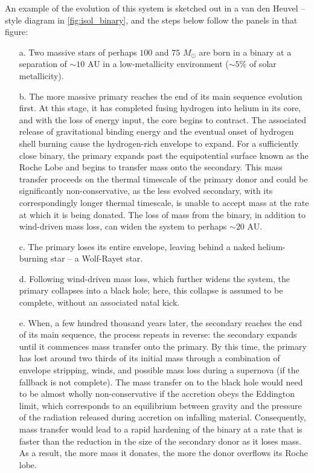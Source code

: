 \documentclass[review]{elsarticle}
\begin{document}
An example of the evolution of this system is sketched out in a van den Heuvel -- style diagram in \autoref{fig:isol_binary}, and the steps below follow the panels in that figure:
\begin{enumerate}  
\item[a.] Two massive stars of perhaps $100$ and $75$ $M_{\odot}$ are born in a binary at a separation of $\sim 10$ AU in a low-metallicity environment ($\sim 5\%$ of solar metallicity).  
\item[b.] The more massive primary reaches the end of its main sequence evolution first.  At this stage, it has completed fusing hydrogen into helium in its core, and with the loss of energy input, the core begins to contract.  The associated release of gravitational binding energy and the eventual onset of hydrogen shell burning cause the hydrogen-rich envelope to expand.  For a sufficiently close binary, the primary expands past the equipotential surface known as the Roche Lobe and begins to transfer mass onto the secondary.  This mass transfer proceeds on the thermal timescale of the primary donor and could be significantly non-conservative, as the less evolved secondary, with its correspondingly longer thermal timescale, is unable to accept mass at the rate at which it is being donated.  The loss of mass from the binary, in addition to wind-driven mass loss, can widen the system to perhaps $\sim 20$ AU.  
\item[c.] The primary loses its entire envelope, leaving behind a naked helium-burning star -- a Wolf-Rayet star.  
\item[d.] Following wind-driven mass loss, which further widens the system, the primary collapses into a black hole; here, this collapse is assumed to be complete, without an associated natal kick.  
\item[e.] When, a few hundred thousand years later, the secondary reaches the end of its main sequence, the process repeats in reverse: the secondary expands until it commences mass transfer onto the primary.  By this time, the primary has lost around two thirds of its initial mass through a combination of envelope stripping, winds, and possible mass loss during a supernova (if the fallback is not complete).  The mass transfer on to the black hole would need to be almost wholly non-conservative if the accretion obeys the Eddington limit, which corresponds to an equilibrium between gravity and the pressure of the radiation released during accretion on infalling material.  Consequently, mass transfer would lead to a rapid hardening of the binary at a rate that is faster than the reduction in the size of the secondary donor as it loses mass.  As a result, the more mass it donates, the more the donor overflows its Roche lobe.  

\end{enumerate}
\end{document}
